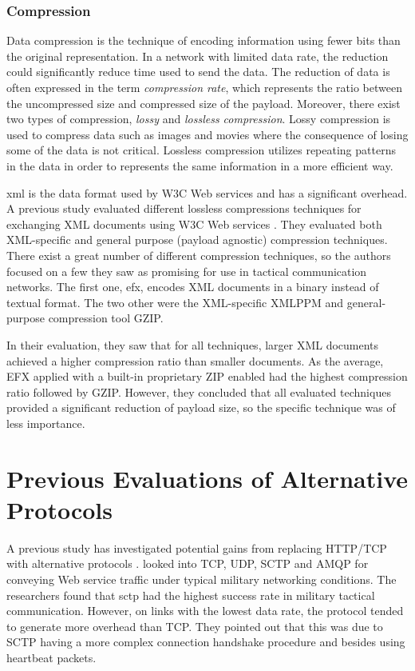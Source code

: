 \subsubsection{Compression}

Data compression is the technique of encoding information using fewer bits than
the original representation. In a network with limited data rate, the reduction
could significantly reduce time used to send the data. The reduction of data is
often expressed in the term \textit{compression rate}, which represents the
ratio between the uncompressed size and compressed size of the payload.
Moreover, there exist two types of compression, \textit{lossy} and
\textit{lossless compression}. Lossy compression is used to compress data such
as images and movies where the consequence of losing some of the data is not
critical. Lossless compression utilizes repeating patterns in the data in order
to represents the same information in a more efficient way.

\gls{xml} is the data format used by W3C Web services and has a significant
overhead. A previous study evaluated different lossless compressions techniques
for exchanging XML documents using W3C Web services \cite{johnsen-compression}.
They evaluated both XML-specific and general purpose (payload agnostic)
compression techniques. There exist a great number of different compression
techniques, so the authors focused on a few they saw as promising for use in
tactical communication networks. The first one, \gls{efx}, encodes XML documents
in a binary instead of textual format. The two other were the XML-specific XMLPPM
and general-purpose compression tool GZIP.

In their evaluation, they saw that for all techniques, larger XML documents
achieved a higher compression ratio than smaller documents. As the average, EFX
applied with a built-in proprietary ZIP enabled had the highest compression
ratio followed by GZIP. However, they concluded that all evaluated techniques
provided a significant reduction of payload size, so the specific technique was
of less importance.


\section{Previous Evaluations of Alternative Protocols}

A previous study has investigated potential gains from replacing HTTP/TCP with
alternative protocols \cite{evaluation-transport-protocols-web-services}.
 looked into TCP, UDP,
SCTP and AMQP for conveying Web service traffic under typical military
networking conditions. The researchers found that \gls{sctp} had the highest
success rate in military tactical communication. However, on links with the
lowest data rate, the protocol tended to generate more overhead than TCP. They
pointed out that this was due to SCTP having a more complex connection handshake
procedure and besides using heartbeat packets.

